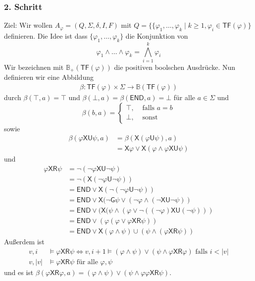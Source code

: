 \documentclass[12pt, german]{article}
\newcommand{\B}{\mathbb{B}}
\newcommand{\sX}{\mathsf{X}}
\newcommand{\sG}{\mathsf{G}}
\newcommand{\sU}{\mathsf{U}}
\newcommand{\sR}{\mathsf{R}}
\newcommand{\sende}{\mathsf{END}}
\newcommand{\tf}{\mathsf{TF}}
\begin{document}
\subsubsection{2. Schritt}
	Ziel: Wir wollen $ A_\varphi =(Q, \Sigma, \delta, I, F)$ mit $Q = \{\{\varphi_1, \ldots, \varphi_k \mid k \geq 1, \varphi_i \in \tf(\varphi)\}$	 definieren. 
	Die Idee ist dass $\{\varphi_1, \ldots, \varphi_k\}$ die Konjunktion von $$\varphi_1 \land \ldots\land \varphi_k = \bigwedge_{i = 1}^k \varphi_i$$
	Wir bezeichnen mit $\B_+(\tf(\varphi))$ die positiven boolschen Ausdrücke. Nun definieren wir eine Abbildung
	\begin{align*}
		\beta: \tf(\varphi) \times \Sigma \to \B(\tf(\varphi))
	\end{align*} durch $\beta(\top, a) = \top$ und $\beta(\bot, a) = \beta(\sende, a) = \bot$ für alle $a \in \Sigma$ und 
	\[\beta(b, a) =  
		\begin{cases}
			\top, & \text{ falls } a = b \\
			\bot, & \text{ sonst}
		\end{cases}	
	\] sowie 
	\begin{align*}
		\beta(\varphi \sX\sU\psi, a) &= \beta(\sX(\varphi \sU \psi), a) \\
		&= \sX \varphi \lor \sX(\varphi \land \varphi \sX\sU \psi)
	\end{align*}
und 
	\begin{align*}
		\varphi \sX\sR\psi &= \neg(\neg\varphi \sX\sU \neg \psi) \\
		&= \neg(\sX(\neg\varphi \sU \neg \psi)) \\
		&=\sende \lor \sX(\neg(\neg \varphi \sU \neg \psi)) \\
		&= \sende \lor \sX(\neg\sG \psi \lor (\neg \varphi\land (\neg \sX\sU \neg \psi)) \\
		&= \sende \lor (\sX(\psi \land (\varphi \lor \neg((\neg \varphi)\sX \sU (\neg \psi))) \\
		&= \sende \lor(\varphi (\varphi \lor \varphi \sX\sR\psi)) \\
		&=\sende \lor \sX(\varphi\land \psi) \cup (\psi \land (\varphi \sX\sR \psi))
	\end{align*} Au\ss erdem ist 
\begin{align*}
	v, i &\models \varphi \sX\sR\psi \iff v, i+1 \models (\varphi \land \psi) \lor (\psi \land \varphi \sX\sR \varphi) \text{ falls } i < |v| \\
	v, |v| &\models \varphi \sX \sR \psi \text{ für alle } \varphi, \psi
\end{align*} und es ist $\beta(\varphi\sX\sR\varphi, a) = (\varphi \land \psi) \lor (\psi \land \varphi \varphi \sX\sR \psi)$. 
\newline
\end{document}
